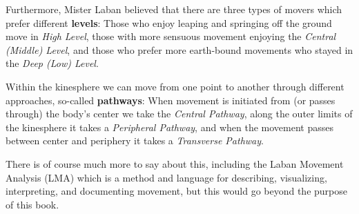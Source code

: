 Furthermore, Mister Laban believed that there are three types of movers which prefer different \textbf{levels}: Those who enjoy leaping and springing off the ground move in \textit{High Level}, those with more sensuous movement enjoying the \textit{Central (Middle) Level}, and those who prefer more earth-bound movements who stayed in the \textit{Deep (Low) Level}.

Within the kinesphere we can move from one point to another through different approaches, so-called \textbf{pathways}: When movement is initiated from (or passes through) the body's center we take the \textit{Central Pathway}, along the outer limits of the kinesphere it takes a \textit{Peripheral Pathway}, and when the movement passes between center and periphery it takes a \textit{Transverse Pathway}.

There is of course much more to say about this, including the Laban Movement Analysis (LMA) which is a method and language for describing, visualizing, interpreting, and documenting movement, but this would go beyond the purpose of this book.
